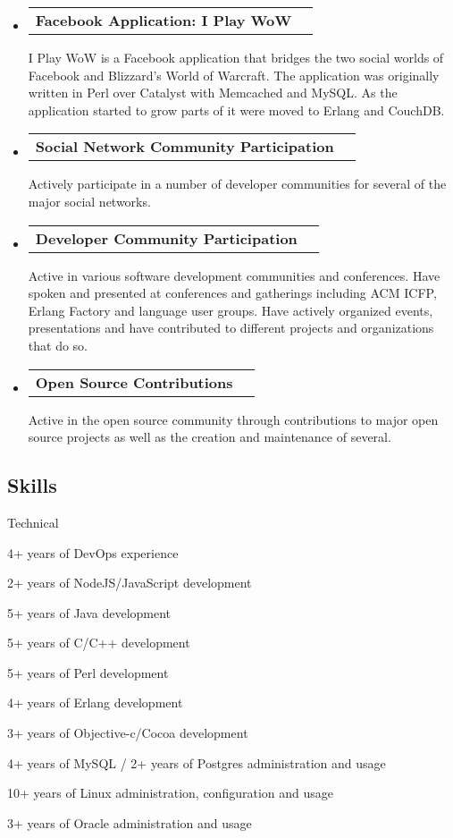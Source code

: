 \documentclass[10pt,letterpaper]{article}
\makeatletter
\newenvironment{indentsection}[1]%
{\begin{list}{}%
  {\setlength{\leftmargin}{#1}}%
  \item[]%
}
{\end{list}}
\newcommand{\headerrow}[2]
{\begin{tabular*}{\linewidth}{l@{\extracolsep{\fill}}r}
  #1 &
  #2 \\
\end{tabular*}}
\makeatother
\begin{document}
\begin{itemize}
  \parskip=0.1em

  \item
  \headerrow
    {\textbf{Facebook Application: I Play WoW}}
    {\textbf{}}
    I Play WoW is a Facebook application that bridges the two social worlds of Facebook and Blizzard's World of Warcraft. The application was originally written in Perl over Catalyst with Memcached and MySQL. As the application started to grow parts of it were moved to Erlang and CouchDB.
  \item
  \headerrow
    {\textbf{Social Network Community Participation}}
    {\textbf{}}
    Actively participate in a number of developer communities for several of the major social networks.
  \item
  \headerrow
    {\textbf{Developer Community Participation}}
    {\textbf{}}
    Active in various software development communities and conferences. Have spoken and presented at conferences and gatherings including ACM ICFP, Erlang Factory and language user groups. Have actively organized events, presentations and have contributed to different projects and organizations that do so.
  \item
  \headerrow
    {\textbf{Open Source Contributions}}
    {\textbf{}}
    Active in the open source community through contributions to major open source projects as well as the creation and maintenance of several.
\end{itemize}

\vspace{-0.4em}
\subsection*{Skills}

\begin{indentsection}{\parindent}
Technical
\begin{itemize*}
        \item 4+ years of DevOps experience
        \item 2+ years of NodeJS/JavaScript development
        \item 5+ years of Java development
        \item 5+ years of C/C++ development
        \item 5+ years of Perl development
        \item 4+ years of Erlang development
        \item 3+ years of Objective-c/Cocoa development
        \item 4+ years of MySQL / 2+ years of Postgres administration and usage
        \item 10+ years of Linux administration, configuration and usage
        \item 3+ years of Oracle administration and usage
\end{itemize*}

\end{indentsection}
\end{document}
